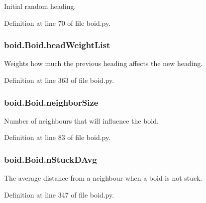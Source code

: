 Initial random heading. 



Definition at line 70 of file boid.\-py.

\hypertarget{classboid_1_1Boid_a4b192d2b077b52005a82df5d98748190}{
\subsubsection[{head\-Weight\-List}]{\setlength{\rightskip}{0pt plus 5cm}boid.\-Boid.\-head\-Weight\-List}}\label{classboid_1_1Boid_a4b192d2b077b52005a82df5d98748190}


Weights how much the previous heading affects the new heading. 



Definition at line 363 of file boid.\-py.

\hypertarget{classboid_1_1Boid_a4af115e678f7716a2eb87c573e71073c}{
\subsubsection[{neighbor\-Size}]{\setlength{\rightskip}{0pt plus 5cm}boid.\-Boid.\-neighbor\-Size}}\label{classboid_1_1Boid_a4af115e678f7716a2eb87c573e71073c}


Number of neighbours that will influence the boid. 



Definition at line 83 of file boid.\-py.

\hypertarget{classboid_1_1Boid_acdfca1dc9b177a512502c6af681bfa9e}{
\subsubsection[{n\-Stuck\-D\-Avg}]{\setlength{\rightskip}{0pt plus 5cm}boid.\-Boid.\-n\-Stuck\-D\-Avg}}\label{classboid_1_1Boid_acdfca1dc9b177a512502c6af681bfa9e}


The average distance from a neighbour when a boid is not stuck. 



Definition at line 347 of file boid.\-py.

